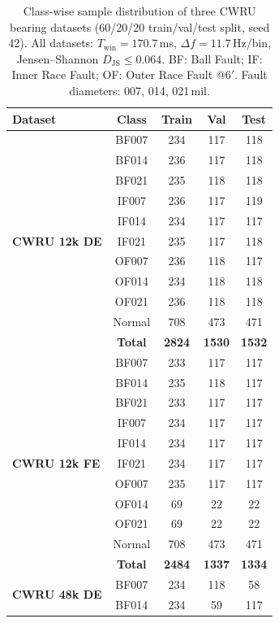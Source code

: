 \documentclass[journal]{IEEEtran}
\begin{document}
\begin{table}[!t]
\centering
\caption{Class-wise sample distribution of three CWRU bearing datasets (60/20/20 train/val/test split, seed 42). All datasets: $T_{\text{win}}=170.7$\,ms, $\Delta f=11.7$\,Hz/bin, Jensen--Shannon $D_{\text{JS}} \leq 0.064$. BF: Ball Fault; IF: Inner Race Fault; OF: Outer Race Fault @6$'$. Fault diameters: 007, 014, 021\,mil.}
\label{tab:datasets_comprehensive}
\small
\renewcommand{\arraystretch}{1.0}
\setlength{\tabcolsep}{5pt}
\begin{tabular}{lcccc}
\toprule
\textbf{Dataset} & \textbf{Class} & \textbf{Train} & \textbf{Val} & \textbf{Test} \\
\midrule
\multirow{11}{*}{\textbf{CWRU 12k DE}} 
& BF007  & 234 & 117 & 118 \\
& BF014  & 236 & 117 & 118 \\
& BF021  & 235 & 118 & 118 \\
& IF007  & 236 & 117 & 119 \\
& IF014  & 234 & 117 & 117 \\
& IF021  & 235 & 117 & 118 \\
& OF007  & 236 & 118 & 117 \\
& OF014  & 234 & 118 & 118 \\
& OF021  & 236 & 118 & 118 \\
& Normal & 708 & 473 & 471 \\
& \textbf{Total} & \textbf{2824} & \textbf{1530} & \textbf{1532} \\
\midrule
\multirow{11}{*}{\textbf{CWRU 12k FE}} 
& BF007  & 233 & 117 & 117 \\
& BF014  & 235 & 118 & 117 \\
& BF021  & 233 & 117 & 117 \\
& IF007  & 234 & 117 & 117 \\
& IF014  & 234 & 117 & 117 \\
& IF021  & 234 & 117 & 117 \\
& OF007  & 235 & 117 & 117 \\
& OF014  & 69  & 22  & 22  \\
& OF021  & 69  & 22  & 22  \\
& Normal & 708 & 473 & 471 \\
& \textbf{Total} & \textbf{2484} & \textbf{1337} & \textbf{1334} \\
\midrule
\multirow{11}{*}{\textbf{CWRU 48k DE}} 
& BF007  & 234 & 118 & 58  \\
& BF014  & 234 & 59  & 117 \\

\end{tabular}
\end{table}
\end{document}
